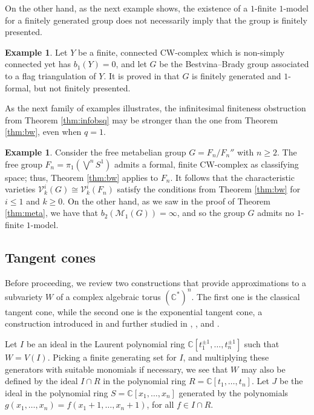 \documentclass{article}
\numberwithin{equation}{section}
\theoremstyle{definition}
\newtheorem{example}[theorem]{Example}
\renewcommand{\C}{\mathbb{C}}
\newcommand{\VV}{\mathcal{V}}
\newcommand{\M}{\mathcal{M}}
\begin{document}
On the other hand, as the next example shows, the existence of a 
$1$-finite $1$-model for a finitely generated group does not 
necessarily imply that the group is finitely presented.

\begin{example}
\label{ex:bbgrps}
Let $Y$ be a finite, connected CW-complex which is non-simply connected yet 
has $b_1(Y)=0$, and let $G$ be the Bestvina--Brady group associated to a flag 
triangulation of $Y$. It is proved in \cite[\S 10]{PS-adv09} that $G$ is finitely generated
and $1$-formal, but not finitely presented. 
\end{example}

As the next family of examples illustrates, the infinitesimal finiteness 
obstruction from Theorem \ref{thm:infobsq} may be stronger than 
the one from Theorem \ref{thm:bw}, even when $q=1$. 

\begin{example}
\label{ex:subtler}
Consider the free metabelian group $G= F_n/F_n''$ with $n\ge 2$. 
The free group $F_n=\pi_1(\bigvee^n S^1)$ admits a formal, finite CW-complex 
as classifying space; thus, Theorem \ref{thm:bw} applies to $F_n$.
It follows that the characteristic varieties $\VV^i_k(G)\cong \VV^i_k(F_n)$ satisfy 
the conditions from Theorem \ref{thm:bw} for $i\le 1$ and $k\ge 0$. 
On the other hand, as we saw in the proof of Theorem \ref{thm:meta}, 
we have that $b_2(\M_1(G))= \infty$, and so the group $G$ admits 
no $1$-finite $1$-model. 
\end{example}

\subsection{Tangent cones}
\label{subsec:exp tc}

Before proceeding, we review two constructions that provide 
approximations to a subvariety $W$ of a complex algebraic 
torus $(\C^*)^n$. The first one is the classical tangent cone, 
while the second one is the exponential tangent cone, 
a construction introduced in \cite{DPS-duke} and further 
studied in \cite{Su-imrn}, \cite{DP-ccm}, and \cite{SYZ}.

Let $I$ be an ideal in the Laurent polynomial ring   
$\C[t_1^{\pm 1},\dots , t_n^{\pm 1}]$ such that $W=V(I)$.   
Picking a finite generating set for $I$, and multiplying 
these generators with suitable monomials if necessary, 
we see that $W$ may also be defined by the ideal $I\cap R$ 
in the polynomial ring $R=\C[t_1,\dots,t_n]$.  
Let $J$ be the ideal  in the polynomial ring 
$S=\C[x_1,\dots, x_n]$ generated by the polynomials 
$g(x_1,\dots, x_n)=f(x_1+1, \dots , x_n+1)$, 
for all $f\in I\cap R$. 
\end{document}
